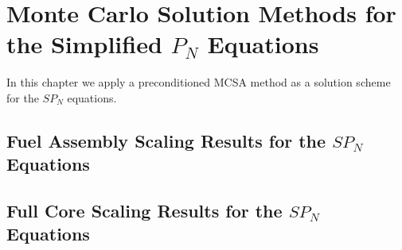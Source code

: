\chapter{Monte Carlo Solution Methods for the Simplified $P_N$ Equations}
\label{ch:mc_spn_solutions}
In this chapter we apply a preconditioned MCSA method as a solution
scheme for the $SP_N$ equations.

\section{Fuel Assembly Scaling Results for the $SP_N$ Equations}
\label{sec:spn_assembly_scaling}

\section{Full Core Scaling Results for the $SP_N$ Equations}
\label{sec:spn_assembly_scaling}
